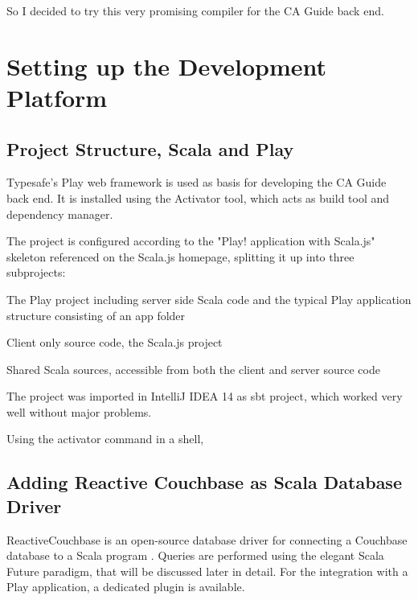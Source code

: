 So I decided to try this very promising compiler for the CA Guide back end.

\section{Setting up the Development Platform}

\subsection{Project Structure, Scala and Play}

Typesafe's Play web framework %
 is used as basis for developing the CA Guide back end. It is installed using the Activator tool, which acts as build tool and dependency manager.
 
The project is configured according to the "Play! application with Scala.js" skeleton \cite{playscalajs} referenced on the Scala.js homepage, splitting it up into three subprojects:

\begin{description}[leftmargin=!,labelwidth=\widthof{\bfseries editor-server}]
\item[$\bullet$ editor-server] The Play project including server side Scala code and the typical Play application structure consisting of an app folder%
\item[$\bullet$ editor-client] Client only source code, the Scala.js project
\item[$\bullet$ editor-shared] Shared Scala sources, accessible from both the client and server source code
\end{description} 
 
The project was imported in IntelliJ IDEA 14 as sbt project, which worked very well without major problems. 

Using the activator command in a shell, %

\subsection{Adding Reactive Couchbase as Scala Database Driver}

ReactiveCouchbase is an open-source database driver for connecting a Couchbase database to a Scala program \cite{reactivecouchbase}. Queries are performed using the elegant Scala Future paradigm, that will be discussed later in detail. For the integration with a Play application, a dedicated plugin is available.

